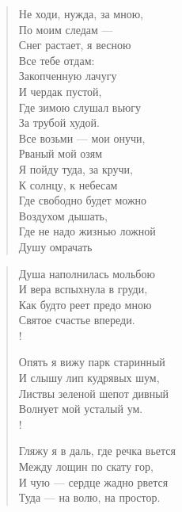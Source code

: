 \newpage
\vspace*{0cm}


\begin{verse}
\begin{altverse}
Не ходи, нужда, за мною,\\
    По моим следам ---\\
Снег растает, я весною\\
    Все тебе отдам:\\
Закопченную лачугу\\
    И чердак пустой,\\
Где зимою слушал вьюгу\\
    За трубой худой.\\
Все возьми --- мои онучи,\\
    Рваный мой озям\ldotst\\
Я пойду туда, за кручи,\\
    К солнцу, к небесам\ldotst\\
Где свободно будет можно\\
    Воздухом дышать,\\
Где не надо жизнью ложной\\
    Душу омрачать\ldotst\\
\end{altverse}
\end{verse}

\newpage
\vspace*{0cm}

\begin{verse}
\begin{altverse}
Душа наполнилась мольбою\\
    И вера вспыхнула в груди,\\
Как будто реет предо мною\\
    Святое счастье впереди.\\!

Опять я вижу парк старинный\\
    И слышу лип кудрявых шум,\\
Листвы зеленой шепот дивный\\
    Волнует мой усталый ум.\\!

Гляжу я в даль, где речка вьется\\
    Между лощин по скату гор,\\
И чую --- сердце жадно рвется\\
    Туда --- на волю, на простор.
\end{altverse}
\end{verse}

